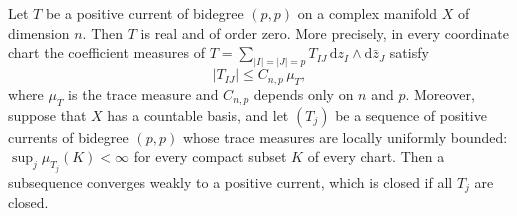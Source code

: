 \begin{theorem}\label{thm:positive-current-order-zero}
Let $T$ be a positive current of bidegree $(p,p)$ on a complex manifold $X$ of dimension $n$. Then $T$ is real and of order zero. More precisely, in every coordinate chart the coefficient measures of $T=\sum_{|I|=|J|=p}T_{IJ}\,\mathrm dz_I\wedge\mathrm d\bar z_J$ satisfy
\[
 |T_{IJ}|\leq C_{n,p}\,\mu_T,
\]
where $\mu_T$ is the trace measure and $C_{n,p}$ depends only on $n$ and $p$. Moreover, suppose that $X$ has a countable basis, and let $(T_j)$ be a sequence of positive currents of bidegree $(p,p)$ whose trace measures are locally uniformly bounded: $\sup_j\mu_{T_j}(K)<\infty$ for every compact subset $K$ of every chart. Then a subsequence converges weakly to a positive current, which is closed if all $T_j$ are closed.
\end{theorem}
